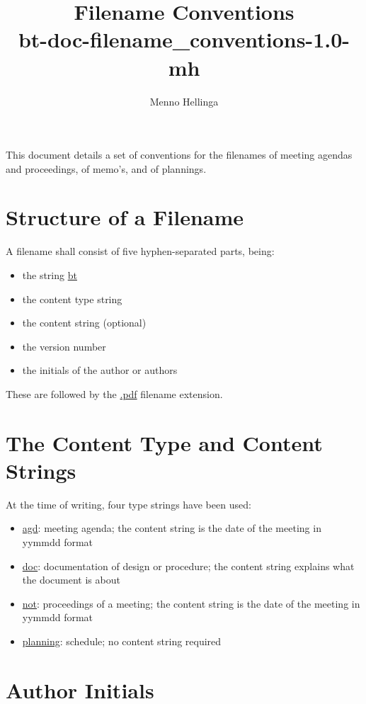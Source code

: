 \documentclass[a4paper, 10pt]{article}
\begin{document}
\title{Filename Conventions\\
bt-doc-filename\_conventions-1.0-mh}
\author{Menno Hellinga}

\maketitle

This document details a set of conventions for the filenames of meeting agendas
and proceedings, of memo's, and of plannings.

\tableofcontents

\section{Structure of a Filename}

A filename shall consist of five hyphen-separated parts, being:
\begin{itemize}
	\item the string \url{bt}
	\item the content type string
	\item the content string (optional)
	\item the version number
	\item the initials of the author or authors
\end{itemize}

These are followed by the \url{.pdf} filename extension.

\section{The Content Type and Content Strings}

At the time of writing, four type strings have been used:
\begin{itemize}
	\item \url{agd}: meeting agenda; the content string is the date of the
		meeting in yymmdd format
	\item \url{doc}: documentation of design or procedure; the content string
		explains what the document is about
	\item \url{not}: proceedings of a meeting; the content string is the date of
		the meeting in yymmdd format
	\item \url{planning}: schedule; no content string required
\end{itemize}

\section{Author Initials}
\end{document}
